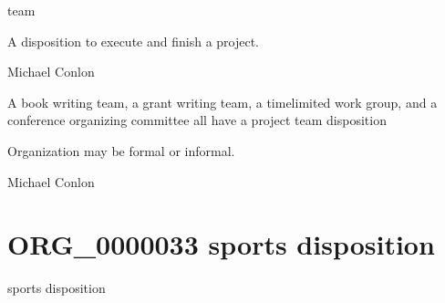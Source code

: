\documentclass[letterpaper,10pt,english]{sphinxmanual}
\begin{document}
\begin{sphinxShadowBox}

\sphinxAtStartPar
team
\end{sphinxShadowBox}

\begin{sphinxShadowBox}

\sphinxAtStartPar
A disposition to execute and finish a project.
\end{sphinxShadowBox}

\begin{sphinxShadowBox}

\sphinxAtStartPar
Michael Conlon 
\end{sphinxShadowBox}

\begin{sphinxShadowBox}

\sphinxAtStartPar
A book writing team, a grant writing team, a time\sphinxhyphen{}limited work group, and a conference organizing committee all have a project team disposition
\end{sphinxShadowBox}

\begin{sphinxShadowBox}

\sphinxAtStartPar
Organization may be formal or informal.
\end{sphinxShadowBox}

\begin{sphinxShadowBox}

\sphinxAtStartPar
Michael Conlon 
\end{sphinxShadowBox}
\begin{quote}
\label{\detokenize{doc-ORG_0000033:org-0000033}}\label{\detokenize{doc-ORG_0000033:sports-disposition}}\label{\detokenize{doc-ORG_0000033:org-0000033}}
\ignorespaces \end{quote}


\section{ORG\_0000033 \sphinxhyphen{} sports disposition}
\label{\detokenize{doc-ORG_0000033:org-0000033-sports-disposition}}\label{\detokenize{doc-ORG_0000033:index-0}}\label{\detokenize{doc-ORG_0000033::doc}}
\begin{sphinxShadowBox}

\sphinxAtStartPar
sports disposition
\end{sphinxShadowBox}
\end{document}
